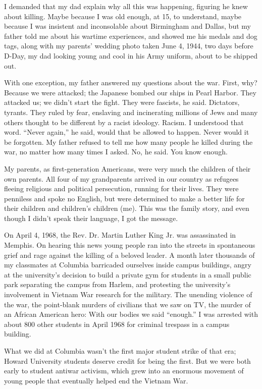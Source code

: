 I demanded that my dad explain why all this was happening, figuring he
knew about killing. Maybe because I was old enough, at 15, to
understand, maybe because I was insistent and inconsolable about
Birmingham and Dallas, but my father told me about his wartime
experiences, and showed me his medals and dog tags, along with my
parents' wedding photo taken June 4, 1944, two days before D-Day, my dad
looking young and cool in his Army uniform, about to be shipped out.

With one exception, my father answered my questions about the war.
First, why? Because we were attacked; the Japanese bombed our ships in
Pearl Harbor. They attacked us; we didn't start the fight. They were
fascists, he said. Dictators, tyrants. They ruled by fear, enslaving and
incinerating millions of Jews and many others thought to be different by
a racist ideology. Racism. I understood that word. ``Never again,'' he
said, would that be allowed to happen. Never would it be forgotten. My
father refused to tell me how many people he killed during the war, no
matter how many times I asked. No, he said. You know enough.

My parents, as first-generation Americans, were very much the children
of their own parents. All four of my grandparents arrived in our country
as refugees fleeing religious and political persecution, running for
their lives. They were penniless and spoke no English, but were
determined to make a better life for their children and children's
children (me). This was the family story, and even though I didn't speak
their language, I got the message.

On April 4, 1968, the Rev. Dr. Martin Luther King Jr. was assassinated
in Memphis. On hearing this news young people ran into the streets in
spontaneous grief and rage against the killing of a beloved leader. A
month later thousands of my classmates at Columbia barricaded ourselves
inside campus buildings, angry at the university's decision to build a
private gym for students in a small public park separating the campus
from Harlem, and protesting the university's involvement in Vietnam War
research for the military. The unending violence of the war, the
point-blank murders of civilians that we saw on TV, the murder of an
African American hero: With our bodies we said ``enough.'' I was
arrested with about 800 other students in April 1968 for criminal
trespass in a campus building.

What we did at Columbia wasn't the first major student strike of that
era; Howard University students deserve credit for being the first. But
we were both early to student antiwar activism, which grew into an
enormous movement of young people that eventually helped end the Vietnam
War.

